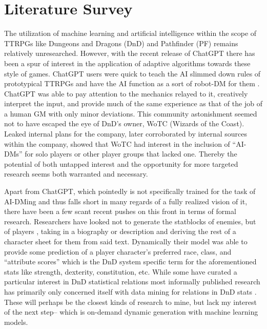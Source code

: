 \documentclass[11pt]{article}
\begin{document}
\section{Literature Survey}

The utilization of machine learning and artificial intelligence within the scope of TTRPGs like Dungeons and Dragons (DnD) and Pathfinder (PF) remains relatively unresearched. However, with the recent release of ChatGPT \cite{openai_2023} there has been a spur of interest in the application of adaptive algorithms towards these style of games. ChatGPT users were quick to teach the AI slimmed down rules of prototypical TTRPGs and have the AI function as a sort of robot-DM for them \cite{murray_2022}. ChatGPT was able to pay attention to the mechanics relayed to it, creatively interpret the input, and provide much of the same experience as that of the job of a human GM with only minor deviations. This community astonishment seemed not to have escaped the eye of DnD's owner, WoTC (Wizards of the Coast). Leaked internal plans for the company, later corroborated by internal sources within the company, showed that WoTC had interest in the inclusion of ``AI-DMs'' \cite{law_2023} for solo players or other player groups that lacked one. Thereby the potential of both untapped interest and the opportunity for more targeted research seems both warranted and necessary.

Apart from ChatGPT, which pointedly is not specifically trained for the task of AI-DMing and thus falls short in many regards of a fully realized vision of it, there have been a few scant recent pushes on this front in terms of formal research. Researchers have looked not to generate the statblocks of enemies, but of players \cite{MacInnes2019TheDS}, taking in a biography or description and deriving the rest of a character sheet for them from said text. Dynamically their model was able to provide some prediction of a player character's preferred race, class, and ``attribute scores'' \cite{MacInnes2019TheDS} which is the DnD system specific term for the aforementioned stats like strength, dexterity, constitution, etc. While some have curated a particular interest in DnD statistical relations \cite{holding_2022, keefe_2020} most informally published research has primarily only concerned itself with data mining for relations in DnD stats \cite{cyberscribe_2020}. These will perhaps be the closest kinds of research to mine, but lack my interest of the next step-- which is on-demand dynamic generation with machine learning models.
\end{document}

